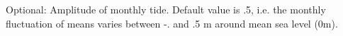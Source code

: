 Optional\+: Amplitude of monthly tide. Default value is .5, i.\+e. the monthly fluctuation of means varies between -\/. and .5 m around mean sea level (0m). 
